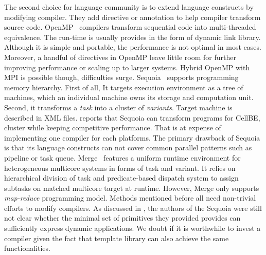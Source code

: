 The second choice for language community is to extend language constructs by
modifying compiler. They add directive or annotation to help compiler
transform source code. OpenMP~\cite{openmp} compilers transform sequential code into
multi-threaded equivalence. The run-time is usually provides in the form of dynamic link library. Although it is simple and
portable, the performance is not optimal in most cases. Moreover, a
handful of directives in OpenMP leave little room for further improving
performance or scaling up to larger systems. Hybrid OpenMP with MPI is
possible though, difficulties surge. Sequoia~\cite{sequoia-compiler} supports
programming memory hierarchy. First of all, It targets execution
environment as a tree of machines, which an individual machine owns
its storage and computation unit. Second, it transforms a
\textit{task} into a
cluster of \emph{variants}. Target machine
is described in XML files. \cite{sequoia} reports that Sequoia can transform programs
for CellBE, cluster while keeping competitive performance. That
is at expense of implementing one compiler for each platforms.
The primary drawback of Sequoia is that its language constructs can not cover common
parallel patterns such as pipeline or task queue. Merge~\cite{merge} features a uniform runtime
environment for heterogeneous multicore 
systems in forms of task and variant. It relies on hierarchical division of task and predicate-based
dispatch system to assign subtasks on matched multicore target at
runtime. However, Merge only
supports \emph{map-reduce} programming model. Methods mentioned before all need non-trivial efforts to
modify compilers. As discussed in \cite{sequoia}, the authors of the Sequoia were
still not clear whether the minimal set of primitives they provided provides can
sufficiently express dynamic applications. We doubt if it is worthwhile to
invest a compiler given the fact that template library can also
achieve the same functionalities.

